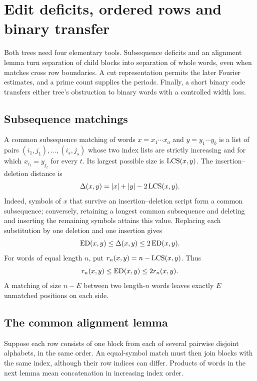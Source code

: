\section{Edit deficits, ordered rows and binary transfer}
\label{sec:preliminaries}

Both trees need four elementary tools. Subsequence deficits and an
alignment lemma turn separation of child blocks into separation of
whole words, even when matches cross row boundaries. A cut
representation permits the later Fourier estimates, and a prime count
supplies the periods. Finally, a short binary code transfers either
tree's obstruction to binary words with a controlled width loss.

\subsection{Subsequence matchings}

A common subsequence matching of words $x=x_1\cdots x_a$ and
$y=y_1\cdots y_b$ is a list of pairs
$(i_1,j_1),\ldots,(i_s,j_s)$ whose two index lists are strictly
increasing and for which $x_{i_t}=y_{j_t}$ for every $t$. Its largest
possible size is $\operatorname{LCS}(x,y)$. The insertion--deletion distance is
\[
 \Delta(x,y)=|x|+|y|-2\operatorname{LCS}(x,y).
\]
Indeed, symbols of $x$ that survive an insertion--deletion script form
a common subsequence; conversely, retaining a longest common subsequence
and deleting and inserting the remaining symbols attains this value.
Replacing each substitution by one deletion and one insertion gives
\begin{equation}\label{eq:metric-conversion}
 \operatorname{ED}(x,y)\leq\Delta(x,y)\leq2\operatorname{ED}(x,y).
\end{equation}
For words of equal length $n$, put $r_n(x,y)=n-\operatorname{LCS}(x,y)$. Thus
\begin{equation}\label{eq:deficit}
 r_n(x,y)\leq\operatorname{ED}(x,y)\leq2r_n(x,y).
\end{equation}
A matching of size $n-E$ between two length-$n$ words leaves exactly
$E$ unmatched positions on each side.

\subsection{The common alignment lemma}

Suppose each row consists of one block from each of several pairwise
disjoint alphabets, in the same order. An equal-symbol match must then
join blocks with the same index, although their row indices can differ.
Products of words in the next lemma mean concatenation in increasing
index order.

